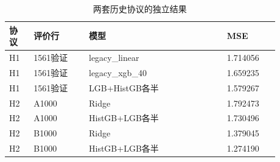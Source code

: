 \begin{table}[htbp]
\small
\setlength{\tabcolsep}{5pt}
\centering
\caption{两套历史协议的独立结果}
\label{tab:historical}
\begin{tabular}{L{0.08\linewidth}L{0.18\linewidth}L{0.45\linewidth}L{0.17\linewidth}}
\toprule
协议 & 评价行 & 模型 & MSE \\
\midrule
H1 & 1561验证 & legacy\_linear & 1.714056 \\
H1 & 1561验证 & legacy\_xgb\_40 & 1.659235 \\
H1 & 1561验证 & LGB+HistGB各半 & 1.579267 \\
H2 & A1000 & Ridge & 1.792473 \\
H2 & A1000 & HistGB+LGB各半 & 1.730496 \\
H2 & B1000 & Ridge & 1.379045 \\
H2 & B1000 & HistGB+LGB各半 & 1.274190 \\
\bottomrule
\end{tabular}
\end{table}
